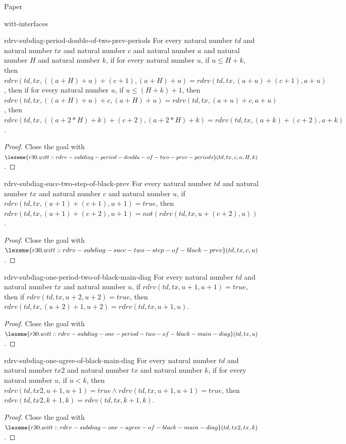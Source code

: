 \begin{lexlean}{Paper}
\begin{section}{witt-interfaces}
  \begin{theorem}{rdrv-subdiag-period-double-of-two-prev-periods}
  For every natural number \(td\) and natural number \(tx\) and natural number \(c\) and natural number \(a\) and natural number \(H\) and natural number \(k\), if for every natural number \(u\), if \(u ≤ H + k\), then \(rdrv(td, tx, ((a + H) + u) + (c + 1), (a + H) + u) = rdrv(td, tx, (a + u) + (c + 1), a + u)\), then if for every natural number \(u\), if \(u ≤ (H + k) + 1\), then \(rdrv(td, tx, ((a + H) + u) + c, (a + H) + u) = rdrv(td, tx, (a + u) + c, a + u)\), then \(rdrv(td, tx, ((a + 2 * H) + k) + (c + 2), (a + 2 * H) + k) = rdrv(td, tx, (a + k) + (c + 2), a + k)\).
  \begin{proof}
  Close the goal with \(\lexeme{r30.witt::rdrv-subdiag-period-double-of-two-prev-periods}(td, tx, c, a, H, k)\).
  \end{proof}
  \end{theorem}

  \begin{theorem}{rdrv-subdiag-succ-two-step-of-black-prev}
  For every natural number \(td\) and natural number \(tx\) and natural number \(c\) and natural number \(u\), if \(rdrv(td, tx, (u + 1) + (c + 1), u + 1) = true\), then \(rdrv(td, tx, (u + 1) + (c + 2), u + 1) = not(rdrv(td, tx, u + (c + 2), u))\).
  \begin{proof}
  Close the goal with \(\lexeme{r30.witt::rdrv-subdiag-succ-two-step-of-black-prev}(td, tx, c, u)\).
  \end{proof}
  \end{theorem}

  \begin{theorem}{rdrv-subdiag-one-period-two-of-black-main-diag}
  For every natural number \(td\) and natural number \(tx\) and natural number \(u\), if \(rdrv(td, tx, u + 1, u + 1) = true\), then if \(rdrv(td, tx, u + 2, u + 2) = true\), then \(rdrv(td, tx, (u + 2) + 1, u + 2) = rdrv(td, tx, u + 1, u)\).
  \begin{proof}
  Close the goal with \(\lexeme{r30.witt::rdrv-subdiag-one-period-two-of-black-main-diag}(td, tx, u)\).
  \end{proof}
  \end{theorem}

  \begin{theorem}{rdrv-subdiag-one-agree-of-black-main-diag}
  For every natural number \(td\) and natural number \(tx2\) and natural number \(tx\) and natural number \(k\), if for every natural number \(u\), if \(u < k\), then \(rdrv(td, tx2, u + 1, u + 1) = true ∧ rdrv(td, tx, u + 1, u + 1) = true\), then \(rdrv(td, tx2, k + 1, k) = rdrv(td, tx, k + 1, k)\).
  \begin{proof}
  Close the goal with \(\lexeme{r30.witt::rdrv-subdiag-one-agree-of-black-main-diag}(td, tx2, tx, k)\).
  \end{proof}
  \end{theorem}


\end{section}
\end{lexlean}
